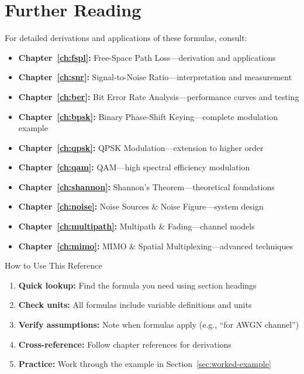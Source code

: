\section{Further Reading}
\label{sec:further-reading}

For detailed derivations and applications of these formulas, consult:

\begin{itemize}
\item \textbf{Chapter~\ref{ch:fspl}:} Free-Space Path Loss---derivation and applications
\item \textbf{Chapter~\ref{ch:snr}:} Signal-to-Noise Ratio---interpretation and measurement
\item \textbf{Chapter~\ref{ch:ber}:} Bit Error Rate Analysis---performance curves and testing
\item \textbf{Chapter~\ref{ch:bpsk}:} Binary Phase-Shift Keying---complete modulation example
\item \textbf{Chapter~\ref{ch:qpsk}:} QPSK Modulation---extension to higher order
\item \textbf{Chapter~\ref{ch:qam}:} QAM---high spectral efficiency modulation
\item \textbf{Chapter~\ref{ch:shannon}:} Shannon's Theorem---theoretical foundations
\item \textbf{Chapter~\ref{ch:noise}:} Noise Sources \& Noise Figure---system design
\item \textbf{Chapter~\ref{ch:multipath}:} Multipath \& Fading---channel models
\item \textbf{Chapter~\ref{ch:mimo}:} MIMO \& Spatial Multiplexing---advanced techniques
\end{itemize}

\begin{calloutbox}{How to Use This Reference}
\begin{enumerate}
\item \textbf{Quick lookup:} Find the formula you need using section headings
\item \textbf{Check units:} All formulas include variable definitions and units
\item \textbf{Verify assumptions:} Note when formulas apply (e.g., ``for AWGN channel'')
\item \textbf{Cross-reference:} Follow chapter references for derivations
\item \textbf{Practice:} Work through the example in Section~\ref{sec:worked-example}
\end{enumerate}
\end{calloutbox}
